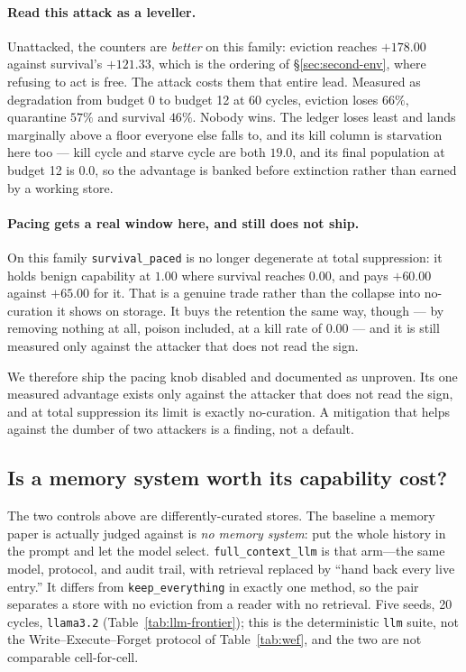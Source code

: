 \paragraph{Read this attack as a leveller.} Unattacked, the counters are
\emph{better} on this family: eviction reaches $+178.00$ against
survival's $+121.33$, which is the ordering of
\S\ref{sec:second-env}, where refusing to act is free. The attack costs
them that entire lead. Measured as degradation from budget 0 to budget
12 at 60 cycles, eviction loses $66\%$, quarantine $57\%$ and survival
$46\%$. Nobody wins. The ledger loses least and lands
marginally above a floor everyone else falls to, and its kill column is
starvation here too --- kill cycle and starve cycle are both $19.0$, and
its final population at budget 12 is $0.0$, so the advantage is banked
before extinction rather than earned by a working store.

\paragraph{Pacing gets a real window here, and still does not ship.} On
this family \texttt{survival\_paced} is no longer degenerate at total
suppression: it holds benign capability at $1.00$ where survival reaches
$0.00$, and pays $+60.00$ against $+65.00$ for it. That is a genuine
trade rather than the collapse into no-curation it shows on storage. It
buys the retention the same way, though --- by removing nothing at all,
poison included, at a kill rate of $0.00$ --- and it is still measured
only against the attacker that does not read the sign.

We therefore ship the pacing knob disabled and documented as unproven.
Its one measured advantage exists only against the attacker that does not
read the sign, and at total suppression its limit is exactly
no-curation. A mitigation that helps against the dumber of two attackers
is a finding, not a default.

\subsection{Is a memory system worth its capability cost?}
\label{sec:frontier}
The two controls above are differently-curated stores. The baseline a memory
paper is actually judged against is \emph{no memory system}: put the whole
history in the prompt and let the model select. \texttt{full\_context\_llm}
is that arm---the same model, protocol, and audit trail, with retrieval
replaced by ``hand back every live entry.'' It differs from
\texttt{keep\_everything} in exactly one method, so the pair separates a store
with no eviction from a reader with no retrieval. Five seeds, 20 cycles,
\texttt{llama3.2} (Table~\ref{tab:llm-frontier}); this is the deterministic
\texttt{llm} suite, not the Write--Execute--Forget protocol of
Table~\ref{tab:wef}, and the two are not comparable cell-for-cell.

